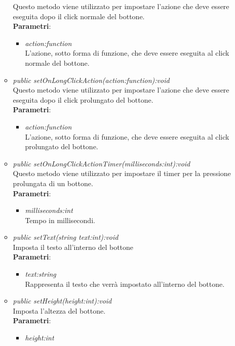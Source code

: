 \begin{itemize}
\begin{itemize}
	Questo metodo viene utilizzato per impostare l'azione che deve essere eseguita dopo il click normale del bottone.
		\\ \textbf{Parametri}: \begin{itemize}
		\item \textit{action:function}\\
		L'azione, sotto forma di funzione, che deve essere eseguita al click normale del bottone.
		\end{itemize}
	\item \textit{public setOnLongClickAction(action:function):void}\\
		Questo metodo viene utilizzato per impostare l'azione che deve essere eseguita dopo il click prolungato del bottone.
		\\ \textbf{Parametri}: \begin{itemize}
		\item \textit{action:function}\\
		L'azione, sotto forma di funzione, che deve essere eseguita al click prolungato del bottone.
		\end{itemize}
		\item \textit{public setOnLongClickActionTimer(milliseconds:int):void}\\
		Questo metodo viene utilizzato per impostare il timer per la pressione prolungata di un bottone.
				\\ \textbf{Parametri}: \begin{itemize}
				\item \textit{milliseconds:int}\\
				Tempo in millisecondi.
	\end{itemize}
	\item \textit{public setText(string text:int):void}\\
	Imposta il testo all'interno del bottone
		\\ \textbf{Parametri}: \begin{itemize}
		\item \textit{text:string}\\
		Rappresenta il testo che verrà impostato all'interno del bottone.
		\end{itemize}
	\item \textit{public setHeight(height:int):void}\\
	Imposta l'altezza del bottone.
		\\ \textbf{Parametri}: \begin{itemize}
		\item \textit{height:int}\\

\end{itemize}
\end{itemize}
\end{itemize}
